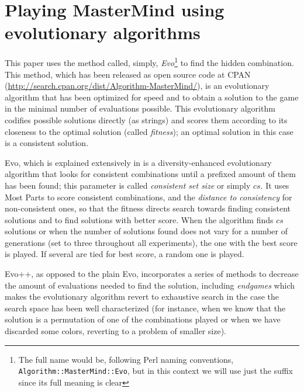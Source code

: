 \documentclass[conference]{IEEEtran}
\begin{document}
\section{Playing MasterMind using evolutionary algorithms}
\label{sec:evo}

This paper uses the
method called, simply, {\em Evo}\footnote{The full name would be,
  following Perl naming conventions, {\tt Algorithm::MasterMind::Evo},
  but in this context we will use just the suffix since its full
  meaning is clear}
\cite{evostar,mm:ppsn:2010,mm:cig,DBLP:conf/evoW/GuervosCM11,DBLP:conf/cec/GuervosMC11}
to find the hidden combination. This
method, which has been released as open  
source code at CPAN
(\url{http://search.cpan.org/dist/Algorithm-MasterMind/}), is an
evolutionary algorithm that has been optimized for speed and to obtain
a solution to the game in the minimal 
number of evaluations possible. This evolutionary
algorithm codifies possible solutions directly (as strings) and
scores them according to its closeness to the optimal
solution (called {\em fitness}); an optimal solution in this case is a
consistent solution.

Evo, which is explained extensively in
\cite{DBLP:conf/cec/GuervosMC11} is a diversity-enhanced  evolutionary
algorithm that looks for consistent combinations 
until a prefixed amount of them has been found; this parameter is
called {\em consistent set size} or simply $cs$. It uses Most Parts to
score consistent combinations, and the {\em distance to consistency}
for non-consistent ones, so that the fitness directs search towards
finding consistent solutions and to find solutions with better
score. When the algorithm finds $cs$ solutions or when the number of
solutions found does not vary for a number of generations (set to
three throughout all experiments), the one with the best score is
played. If several are tied for best score, a random one is played. 

Evo++, as opposed to the plain Evo,
incorporates a series of methods to decrease the amount of
evaluations needed to find the solution, including {\em endgames} \cite{DBLP:conf/cec/GuervosMC11}
which makes the evolutionary algorithm revert to exhaustive search in
the case the search space has been well characterized (for instance,
when we know that the solution is a permutation of one of the
combinations played or when we have discarded some colors, reverting
to a problem of smaller size). 
\end{document}
